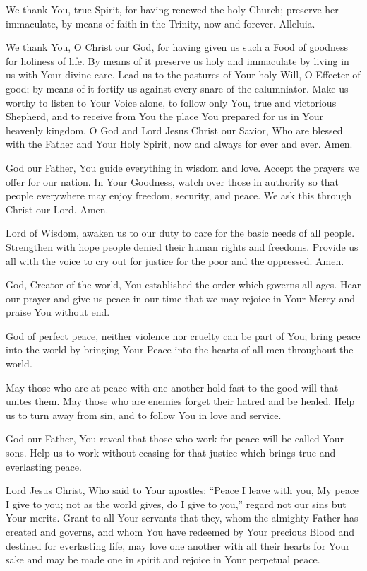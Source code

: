 We thank You, true Spirit, for having renewed the holy Church; preserve her immaculate, by means of faith in the Trinity, now and forever. Alleluia.

We thank You, O Christ our God, for having given us such a Food of goodness for
holiness of life.
By means of it preserve us holy and immaculate by living in us with Your divine care.
Lead us to the pastures of Your holy Will, O Effecter of good; by means of it fortify us against every snare of the calumniator.
Make us worthy to listen to Your Voice alone, to follow only You, true and victorious Shepherd, and to receive from You the place You prepared for us in Your heavenly kingdom, O God and Lord Jesus Christ our Savior, Who are blessed with the Father and Your Holy Spirit, now and always for ever and ever.
Amen.

\label{prayer:civic-leaders}
God our Father, You guide everything in wisdom and love.
Accept the prayers we offer for our nation.
In Your Goodness, watch over those in authority so that people everywhere may enjoy freedom, security, and peace.
We ask this through Christ our Lord.
Amen.

\label{prayer:basic-rights}
Lord of Wisdom, awaken us to our duty to care for the basic needs of all people.
Strengthen with hope people denied their human rights and freedoms.
Provide us all with the voice to cry out for justice for the poor and the oppressed.
Amen.

God, Creator of the world, You established the order which governs all ages.
Hear our prayer and give us peace in our time that we may rejoice in Your Mercy and praise You without end.

God of perfect peace, neither violence nor cruelty can be part of You;
bring peace into the world by bringing Your Peace into the hearts of all men throughout the world.

May those who are at peace with one another hold fast to the good will that unites them.
May those who are enemies forget their hatred and be healed.
Help us to turn away from sin, and to follow You in love and service.

God our Father, You reveal that those who work for peace will be called Your sons.
Help us to work without ceasing for that justice which brings true and everlasting peace.

Lord Jesus Christ, Who said to Your apostles:
``Peace I leave with you, My peace I give to you;
not as the world gives, do I give to you,''
regard not our sins but Your merits.
Grant to all Your servants that they, whom the almighty Father has created and governs, and whom You have redeemed by Your precious Blood and destined for everlasting life, may love one another with all their hearts for Your sake and may be made one in spirit and rejoice in Your perpetual peace.

